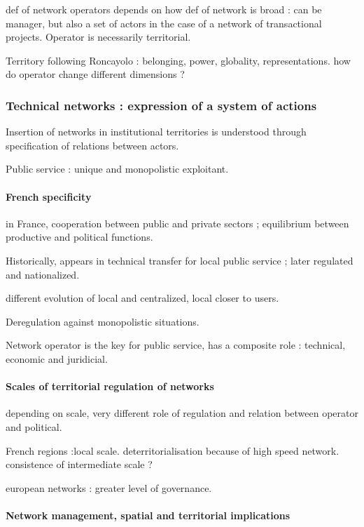 def of network operators depends on how def of network is broad : can be manager, but also a set of actors in the case of a network of transactional projects. Operator is necessarily territorial.

Territory following Roncayolo : belonging, power, globality, representations. how do operator change different dimensions ?

\subsubsection*{Technical networks : expression of a system of actions}

Insertion of networks in institutional territories is understood through specification of relations between actors.

Public service : unique and monopolistic exploitant.

\paragraph{French specificity}

in France, cooperation between public and private sectors ; equilibrium between productive and political functions.

Historically, appears in technical transfer for local public service ; later regulated and nationalized.

different evolution of local and centralized, local closer to users.

Deregulation against monopolistic situations.

Network operator is the key for public service, has a composite role : technical, economic and juridicial.

\paragraph{Scales of territorial regulation of networks}

depending on scale, very different role of regulation and relation between operator and political.

French regions :local scale. deterritorialisation because of high speed network. consistence of intermediate scale ?

european networks : greater level of governance.

\paragraph{Network management, spatial and territorial implications}

